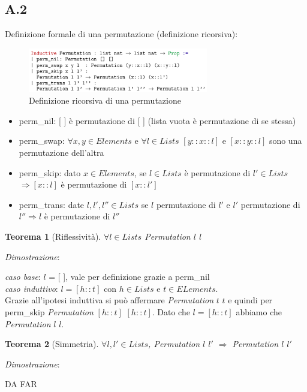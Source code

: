 \documentclass[a4paper]{article}
\newtheorem*{theorem}{Teorema}
\newenvironment{dimostrazione}{\textit{Dimostrazione}:\begin{adjustwidth}{1cm}{}}{\end{adjustwidth}}
\begin{document}
\subsection{A.2}
Definizione formale di una permutazione (definizione ricorsiva):
\begin{figure}[!ht]
\centering
\includegraphics[width=0.7\textwidth]{./img/permutazione_ricorsiva.png}
\caption{Definizione ricorsiva di una permutazione} \label{FIG:recursive_permutation1}
\end{figure}
\begin{itemize}
	\item perm\_nil: [ ] è permutazione di [ ] (lista vuota è permutazione di se stessa)
	\item perm\_swap: $\forall x,y \in Elements$ e $\forall l \in Lists$ $[y::x::l]$ e $[x::y::l]$ sono una permutazione dell'altra
	\item perm\_skip: dato $x \in Elements$, se $l \in Lists$ è permutazione di $l' \in Lists$ $\Rightarrow [x::l]$ è permutazione di $[x::l']$
	\item perm\_trans: date $l, l', l'' \in Lists$ se $l$ permutazione di $l'$ e $l'$ permutazione di $l'' \Rightarrow l$ è permutazione di $l''$ 
\end{itemize}
\begin{theorem}[Riflessività] $\forall l \in Lists$ Permutation $l$ $l$\end{theorem}
\textit{Dimostrazione}:
\begin{adjustwidth}{2cm}{}
	\textit{caso base}: $l$ = [ ], vale per definizione grazie a perm\_nil\\
	\textit{caso induttivo}: $l = [h::t]$ con $h \in Lists$ e $t \in ELements$.\\
	Grazie all'ipotesi induttiva si può affermare \textit{Permutation} $t$ $t$ e quindi per perm\_skip \textit{Permutation} $[h::t]$ $[h::t]$. Dato che $l = [h::t]$ abbiamo che \textit{Permutation} $l$ $l$.
\end{adjustwidth}
\begin{theorem}[Simmetria] $\forall l,l' \in Lists$, Permutation $l$ $l'$ $\Rightarrow $ Permutation $l$ $l'$\end{theorem}
\begin{dimostrazione}
	DA FAR
\end{dimostrazione}
\end{document}
